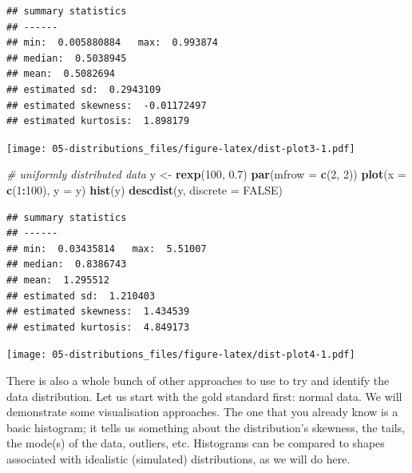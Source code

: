 \documentclass[english,10pt,a4paper,oneside]{book}
\newenvironment{Shaded}{\begin{snugshade}}{\end{snugshade}}
\newcommand{\CommentTok}[1]{\textcolor[rgb]{0.56,0.35,0.01}{\textit{#1}}}
\newcommand{\DataTypeTok}[1]{\textcolor[rgb]{0.13,0.29,0.53}{#1}}
\newcommand{\DecValTok}[1]{\textcolor[rgb]{0.00,0.00,0.81}{#1}}
\newcommand{\FloatTok}[1]{\textcolor[rgb]{0.00,0.00,0.81}{#1}}
\newcommand{\KeywordTok}[1]{\textcolor[rgb]{0.13,0.29,0.53}{\textbf{#1}}}
\newcommand{\NormalTok}[1]{#1}
\newcommand{\OperatorTok}[1]{\textcolor[rgb]{0.81,0.36,0.00}{\textbf{#1}}}
\newcommand{\OtherTok}[1]{\textcolor[rgb]{0.56,0.35,0.01}{#1}}
\newcommand{\StringTok}[1]{\textcolor[rgb]{0.31,0.60,0.02}{#1}}
\theoremstyle{definition}
\theoremstyle{definition}
\theoremstyle{definition}
\theoremstyle{remark}
\begin{document}
\begin{verbatim}
## summary statistics
## ------
## min:  0.005880884   max:  0.993874 
## median:  0.5038945 
## mean:  0.5082694 
## estimated sd:  0.2943109 
## estimated skewness:  -0.01172497 
## estimated kurtosis:  1.898179
\end{verbatim}

\texttt{[image: 05-distributions\_files/figure-latex/dist-plot3-1.pdf]}

\begin{Shaded}
\begin{Highlighting}[]
\CommentTok{# uniformly distributed data}
\NormalTok{y <-}\StringTok{ }\KeywordTok{rexp}\NormalTok{(}\DecValTok{100}\NormalTok{, }\FloatTok{0.7}\NormalTok{)}
\KeywordTok{par}\NormalTok{(}\DataTypeTok{mfrow =} \KeywordTok{c}\NormalTok{(}\DecValTok{2}\NormalTok{, }\DecValTok{2}\NormalTok{))}
\KeywordTok{plot}\NormalTok{(}\DataTypeTok{x =} \KeywordTok{c}\NormalTok{(}\DecValTok{1}\OperatorTok{:}\DecValTok{100}\NormalTok{), }\DataTypeTok{y =}\NormalTok{ y)}
\KeywordTok{hist}\NormalTok{(y)}
\KeywordTok{descdist}\NormalTok{(y, }\DataTypeTok{discrete =} \OtherTok{FALSE}\NormalTok{)}
\end{Highlighting}
\end{Shaded}

\begin{verbatim}
## summary statistics
## ------
## min:  0.03435814   max:  5.51007 
## median:  0.8386743 
## mean:  1.295512 
## estimated sd:  1.210403 
## estimated skewness:  1.434539 
## estimated kurtosis:  4.849173
\end{verbatim}

\texttt{[image: 05-distributions\_files/figure-latex/dist-plot4-1.pdf]}

There is also a whole bunch of other approaches to use to try and
identify the data distribution. Let us start with the gold standard
first: normal data. We will demonstrate some visualisation approaches.
The one that you already know is a basic histogram; it tells us
something about the distribution's skewness, the tails, the mode(s) of
the data, outliers, etc. Histograms can be compared to shapes associated
with idealistic (simulated) distributions, as we will do here.
\end{document}
